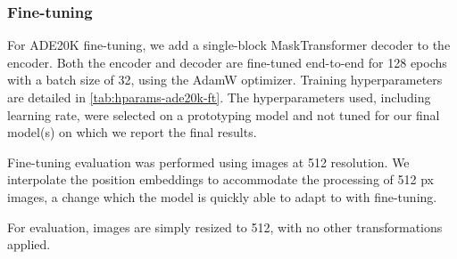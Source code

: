 \subsubsection{Fine-tuning}
\label{s:ade20k-ft}

For ADE20K fine-tuning, we add a single-block MaskTransformer decoder \citep{strudel2021segmenter} to the encoder.
Both the encoder and decoder are fine-tuned end-to-end for 128 epochs with a batch size of 32, using the AdamW optimizer.
Training hyperparameters are detailed in \cref{tab:hparams-ade20k-ft}.
The hyperparameters used, including learning rate, were selected on a prototyping model and not tuned for our final model(s) on which we report the final results.

Fine-tuning evaluation was performed using images at 512 resolution.
We interpolate the position embeddings to accommodate the processing of 512 px images, a change which the model is quickly able to adapt to with fine-tuning.

For evaluation, images are simply resized to 512, with no other transformations applied.

